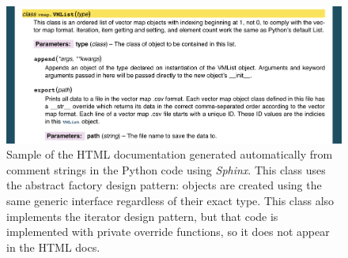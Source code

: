 \documentclass[12pt,twoside]{article}
\begin{document}
\begin{figure}[ht]
    \centering
    \includegraphics[width=16cm,keepaspectratio]{doc.png}
    \caption{Sample of the HTML documentation generated automatically from comment strings in the Python code using \textit{Sphinx}. This class uses the abstract factory design pattern: objects are created using the same generic interface regardless of their exact type. This class also implements the iterator design pattern, but that code is implemented with private override functions, so it does not appear in the HTML docs.}
    \label{fig:doc-sample}
\end{figure}
\end{document}
